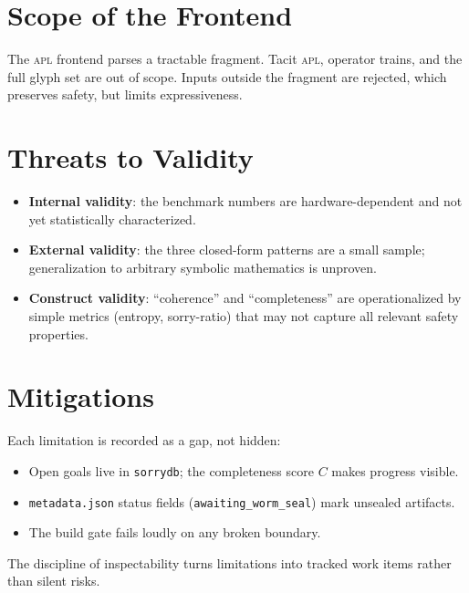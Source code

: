 \section{Scope of the Frontend}
\label{sec:lim-apl}

The \textsc{apl} frontend parses a tractable fragment. Tacit \textsc{apl},
operator trains, and the full glyph set are out of scope. Inputs outside the
fragment are rejected, which preserves safety, but limits expressiveness.

\section{Threats to Validity}
\label{sec:lim-threats}

\begin{itemize}
  \item \textbf{Internal validity}: the benchmark numbers are
        hardware-dependent and not yet statistically characterized.
  \item \textbf{External validity}: the three closed-form patterns are a small
        sample; generalization to arbitrary symbolic mathematics is unproven.
  \item \textbf{Construct validity}: ``coherence'' and ``completeness'' are
        operationalized by simple metrics (entropy, sorry-ratio) that may not
        capture all relevant safety properties.
\end{itemize}

\section{Mitigations}
\label{sec:lim-mit}

Each limitation is recorded as a gap, not hidden:
\begin{itemize}
  \item Open goals live in \texttt{sorrydb}; the completeness score $C$
        makes progress visible.
  \item \texttt{metadata.json} status fields (\texttt{awaiting\_worm\_seal})
        mark unsealed artifacts.
  \item The build gate fails loudly on any broken boundary.
\end{itemize}
The discipline of inspectability turns limitations into tracked work items
rather than silent risks.
